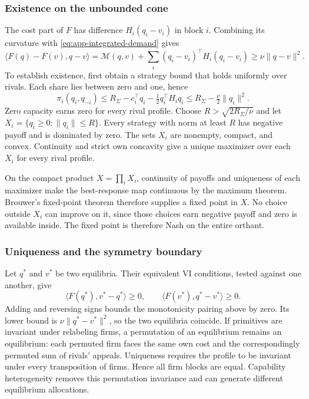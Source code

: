 \subsubsection{Existence on the unbounded cone}

The cost part of $F$ has difference $H_i(q_i-v_i)$ in block $i$.
Combining its curvature with \eqref{eq:app-integrated-demand} gives
\begin{equation}\label{eq:strong-monotonicity}
  \langle F(q)-F(v),q-v\rangle
  =\mathcal M(q,v)+\sum_i(q_i-v_i)^\top H_i(q_i-v_i)
  \geq\nu\|q-v\|^2.
\end{equation}
To establish existence, first obtain a strategy bound that holds
uniformly over rivals.
Each share lies between zero and one, hence
\begin{equation}\label{eq:app-capacity-bound}
  \pi_i(q_i,q_{-i})\leq R_\Sigma-c_i^\top q_i-\tfrac12q_i^\top H_i q_i
  \leq R_\Sigma-\tfrac\nu2\|q_i\|^2.
\end{equation}
Zero capacity earns zero for every rival profile.
Choose $R>\sqrt{2R_\Sigma/\nu}$ and let
$X_i=\{q_i\geq0:\|q_i\|\leq R\}$.
Every strategy with norm at least $R$ has negative payoff and is
dominated by zero.
The sets $X_i$ are nonempty, compact, and convex.
Continuity and strict own concavity give a unique maximizer over each
$X_i$ for every rival profile.

On the compact product $X=\prod_i X_i$, continuity of payoffs and uniqueness
of each maximizer make the best-response map continuous by the maximum theorem.
Brouwer's fixed-point theorem therefore supplies a fixed point in $X$.
No choice outside $X_i$ can improve on it, since those choices earn
negative payoff and zero is available inside.
The fixed point is therefore Nash on the entire orthant.

\subsubsection{Uniqueness and the symmetry boundary}\label{app:symmetry-proof}

Let $q^*$ and $v^*$ be two equilibria.
Their equivalent VI conditions, tested against one another, give
\begin{equation}\label{eq:app-uniqueness}
  \langle F(q^*),v^*-q^*\rangle\geq0,\qquad
  \langle F(v^*),q^*-v^*\rangle\geq0.
\end{equation}
Adding and reversing signs bounds the monotonicity pairing above by zero.
Its lower bound is $\nu\|q^*-v^*\|^2$, so the two equilibria coincide.
If primitives are invariant under relabeling firms, a permutation of
an equilibrium remains an equilibrium:
each permuted firm faces the same own cost and the correspondingly
permuted sum of rivals' appeals.
Uniqueness requires the profile to be invariant under every
transposition of firms.
Hence all firm blocks are equal.
Capability heterogeneity removes this permutation invariance and can
generate different equilibrium allocations.

